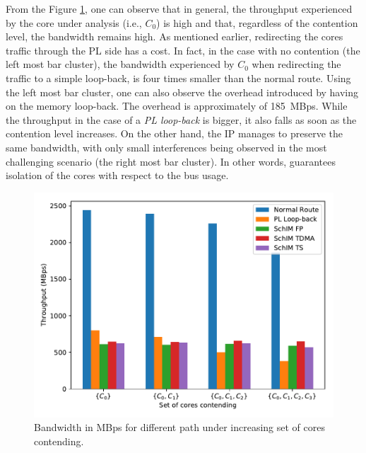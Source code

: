     From the Figure \ref{fig:bandwidth_comparison}, one can observe that in general, the throughput experienced by the core under analysis (i.e., $C_{0}$) is high and that, regardless of the contention level, the bandwidth remains high. As mentioned earlier, redirecting the cores traffic through the PL side has a cost. In fact, in the case with no contention (the left most bar cluster), the bandwidth experienced by $C_{0}$ when redirecting the traffic to a simple loop-back, is four times smaller than the normal route.
    Using the left most bar cluster, one can also observe the overhead introduced by having \schim on the memory loop-back. The overhead is approximately of 185~MBps.
    While the throughput in the case of a \emph{PL loop-back} is bigger, it also falls as soon as the contention level increases.
    On the other hand, the \schim IP manages to preserve the same bandwidth, with only small interferences being observed in the most challenging scenario (the right most bar cluster). In other words, \schim guarantees isolation of the cores with respect to the bus usage.
     
    \begin{figure}
      \centering
      \includegraphics[scale=0.5]{images/bw_comparisons.pdf}
      \caption{Bandwidth in MBps for different path under increasing set of cores contending.}
      \label{fig:bandwidth_comparison}
    \end{figure}

